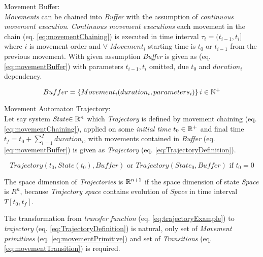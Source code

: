     \begin{definition}{Movement Buffer:}\label{def:MovementBuffer}\\
        \noindent\emph{Movements} can be chained into \emph{Buffer} with the assumption of \emph{continuous movement execution}. \emph{Continuous movement executions} each movement in the chain (eq. \ref{eq:movementChaining}) is executed in time interval $\tau_i=(t_{i-1},t_{i}]$ where $i$ is movement order and $\forall$ $Movement_i$ starting time is $t_0$ or $t_{i-1}$ from the previous movement. With given assumption \emph{Buffer} is given as (eq. \ref{eq:movementBuffer}) with parameters $t_{i-1},t_{i}$ omitted, due $t_0$ and $duration_i$ dependency.
        
        \begin{equation}\label{eq:movementBuffer}
            Buffer = \left\{Movement_i(duration_i,parameters_i)\right\}i\in\mathbb{N}^+
        \end{equation}
    \end{definition}
    
    \begin{definition}{Movement Automaton Trajectory:}\label{def:MovementAutomatonTrajectory}\\
        Let say system \emph{State}$\in\mathbb{R}^n$ which \emph{Trajectory} is defined by movement chaining (eq. \ref{eq:movementChaining}), applied on some \emph{initial time} $t_0\in\mathbb{R}^+$ and final time $t_f=t_0+\sum_{i=1}^{I}duration_i$, with movements contained in \emph{Buffer} (eq. \ref{eq:movementBuffer}) is given as \emph{Trajectory} (eq. \ref{eq:TrajectoryDefinition}).
        
        \begin{equation}\label{eq:TrajectoryDefinition}
            Trajectory(t_0,State(t_0),Buffer)\text{ or } Trajectory(State_0,Buffer) \text{ if } t_0=0
        \end{equation}
    \end{definition}


    \begin{note}
        The space dimension of \emph{Trajectories} is $\mathbb{R}^{n+1}$ if the space dimension of state \emph{Space} is $R^n$, because \emph{Trajectory space} contains evolution of \emph{Space} in time interval $T[t_0,t_f]$.
        
        \noindent The transformation from \emph{transfer function} (eq. \ref{eq:trajectoryExample}) to \emph{trajectory} (eq. \ref{eq:TrajectoryDefinition}) is natural, only set of \emph{Movement primitives} (eq. \ref{eq:movementPrimitive}) and set of \emph{Transitions} (eq. \ref{eq:movementTransition}) is required.
    \end{note}

